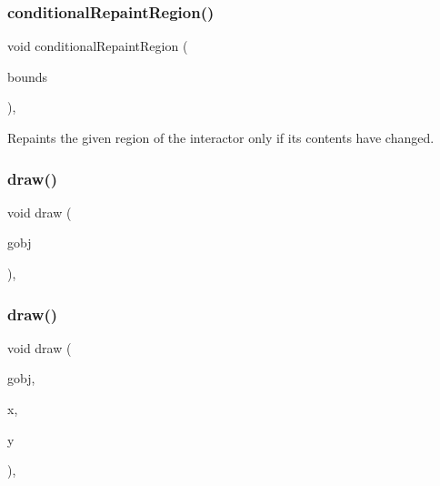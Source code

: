 \subsubsection{\texorpdfstring{conditional\+Repaint\+Region()}{conditionalRepaintRegion()}\hspace{0.1cm}{\footnotesize\ttfamily [2/2]}}
{\footnotesize\ttfamily void conditional\+Repaint\+Region (\begin{DoxyParamCaption}\item[{const \mbox{\hyperlink{structGRectangle}{G\+Rectangle}} \&}]{bounds }\end{DoxyParamCaption})\hspace{0.3cm}{\ttfamily [virtual]}, {\ttfamily [inherited]}}



Repaints the given region of the interactor only if its contents have changed. 

\mbox{\label{classGForwardDrawingSurface_a7f7f6c1798bcedfd52151b458074e8a0}} 
\subsubsection{\texorpdfstring{draw()}{draw()}\hspace{0.1cm}{\footnotesize\ttfamily [1/5]}}
{\footnotesize\ttfamily void draw (\begin{DoxyParamCaption}\item[{\mbox{\hyperlink{classGObject}{G\+Object}} $\ast$}]{gobj }\end{DoxyParamCaption})\hspace{0.3cm}{\ttfamily [override]}, {\ttfamily [inherited]}}

\mbox{\label{classGForwardDrawingSurface_a5472166cdc28217d02cb4921294cc388}} 
\subsubsection{\texorpdfstring{draw()}{draw()}\hspace{0.1cm}{\footnotesize\ttfamily [2/5]}}
{\footnotesize\ttfamily void draw (\begin{DoxyParamCaption}\item[{\mbox{\hyperlink{classGObject}{G\+Object}} $\ast$}]{gobj,  }\item[{double}]{x,  }\item[{double}]{y }\end{DoxyParamCaption})\hspace{0.3cm}{\ttfamily [override]}, {\ttfamily [inherited]}}

